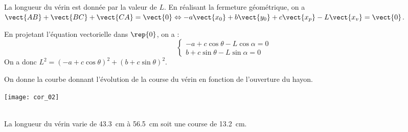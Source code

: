 
\ifprof
\begin{corrige}~\\
La longueur du vérin est donnée par la valeur de $L$. En réalisant la fermeture géométrique, on a $\vect{AB}+\vect{BC}+\vect{CA}=\vect{0} \Leftrightarrow 
-a\vect{x_0}+b\vect{y_0} + c\vect{x_p} -L\vect{x_v} =\vect{0}$.

En projetant l'équation vectorielle dans $\rep{0}$, on a : 
$$
\left\{ 
\begin{array}{l}
-a + c\cos\theta -L\cos\alpha ={0} \\
b + c\sin\theta -L\sin\alpha ={0}
\end{array}
\right.
$$
On a donc $L^2 =\left(-a + c\cos\theta \right)^2 + \left(b + c\sin\theta \right)^2  $.

\end{corrige}
\else
\fi

\ifprof
\else
On donne la courbe donnant l'évolution de la course du vérin en fonction de l'ouverture du hayon. 
\begin{marginfigure}
\texttt{[image: cor\_02]}
\end{marginfigure}
\fi


\ifprof
\begin{corrige}~\\
La longueur du vérin varie de \SI{43,3}{cm} à \SI{56,5}{cm} soit une course de \SI{13,2}{cm}. 
\end{corrige}
\else
\fi


%
%
%

